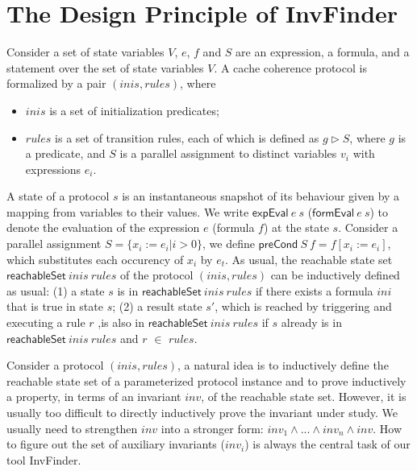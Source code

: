\documentclass{llncs}
\begin{document}
\section{The Design Principle of {\sf InvFinder}}
Consider a set of state variables $V$,
$e$, $f$ and $S$ are an expression, a formula, and a statement over
the set of state variables $V$. A cache coherence protocol is formalized by a pair $(inis,rules)$,
where
%
\begin{itemize}
\item $inis $ is a set of initialization predicates;

\item $rules$ is a set of transition rules, each of which is defined as
  $g \vartriangleright  S$, where $g$ is a predicate, and $S$ is a
  parallel assignment to distinct  variables $v_i$ with expressions
  $e_i$.
\end{itemize}

A  state of a protocol $s$ is an instantaneous snapshot of its
behaviour given by a mapping from variables to their values. We
write $\mathsf{expEval}~e~s$ ($\mathsf{formEval}~e~s$) to denote the
evaluation of the expression $e$ (formula $f$) at the state $s$.
Consider a parallel assignment  $S=\{x_i:=e_i | i>0\}$, we define
$\mathsf{preCond}~S~f=f[x_i:=e_i]$, which substitutes each occurency
of $x_i$ by $e_t$. As usual, the reachable state set
$\mathsf{reachableSet}~ inis ~rules$ of the protocol $(inis,rules)$
can be inductively defined as usual: (1) a state $s$ is in
$\mathsf{reachableSet}~inis~ rules$ if
 there exists a formula $ini$ that is true in state $s$; (2) a result state $s'$, which is reached by triggering and
 executing a rule $r$ ,is also in
 $\mathsf{reachableSet}~inis~ rules$ if $s$ already is in
 $\mathsf{reachableSet}~inis~ rules$ and $r $ $\in$  $rules$.

Consider a protocol $(inis,rules)$, a natural
idea is to inductively define the reachable state set of a
parameterized protocol instance and to prove inductively a
property, in terms of an invariant $inv$, of the reachable state set.
However, it is usually too difficult to directly inductively prove the invariant under study.
We usually need to strengthen $inv$ into a stronger form:
$inv_1\wedge ...\wedge inv_n \wedge inv$.
How to figure out the set of auxiliary invariants ($inv_i$)
is always the central task of our tool {\sf InvFinder}.
\end{document}
